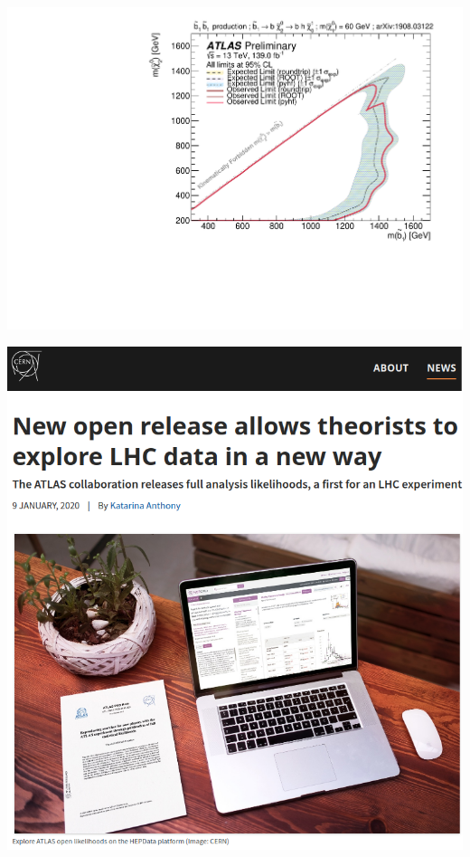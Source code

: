\documentclass[princeton,portrait]{a0poster}
\begin{document}
\begin{multicols}{2}
 \begin{minipage}{\linewidth}
  \begin{minipage}{0.5\linewidth}
   \begin{center}
    \href{https://atlas.web.cern.ch/Atlas/GROUPS/PHYSICS/PUBNOTES/ATL-PHYS-PUB-2019-029/}{\includegraphics[width=\linewidth]{ATL-PHYS-PUB-2019-029_multi-b_limit.pdf}}
   \end{center}
  \end{minipage}
  \begin{minipage}{0.5\linewidth}
   \begin{center}
    \href{https://home.cern/news/news/knowledge-sharing/new-open-release-allows-theorists-explore-lhc-data-new-way}{\includegraphics[width=0.68\linewidth]{CERN_new_story_crop.png}}

\end{center}
\end{minipage}
\end{minipage}
\end{multicols}
\end{document}
